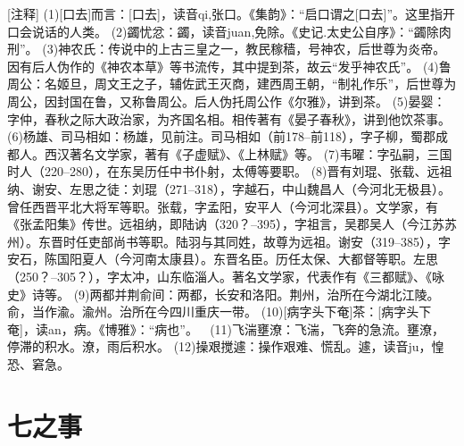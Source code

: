 \documentclass[12pt,UTF8]{ctexbook}
\begin{document}
[注释]
(1)[口去]而言：[口去]，读音qi,张口。《集韵》：“启口谓之[口去]”。这里指开口会说话的人类。
(2)蠲忧忿：蠲，读音juan,免除。《史记.太史公自序》：“蠲除肉刑”。
(3)神农氏：传说中的上古三皇之一，教民稼穑，号神农，后世尊为炎帝。因有后人伪作的《神农本草》等书流传，其中提到茶，故云“发乎神农氏”。
(4)鲁周公：名姬旦，周文王之子，辅佐武王灭商，建西周王朝，“制礼作乐”，后世尊为周公，因封国在鲁，又称鲁周公。后人伪托周公作《尔雅》，讲到茶。
(5)晏婴：字仲，春秋之际大政治家，为齐国名相。相传著有《晏子春秋》，讲到他饮茶事。
(6)杨雄、司马相如：杨雄，见前注。司马相如（前178--前118），字子柳，蜀郡成都人。西汉著名文学家，著有《子虚赋》、《上林赋》等。 
(7)韦曜：字弘嗣，三国时人（220--280），在东吴历任中书仆射，太傅等要职。
(8)晋有刘琨、张载、远祖纳、谢安、左思之徒：刘琨（271--318），字越石，中山魏昌人（今河北无极县）。曾任西晋平北大将军等职。张载，字孟阳，安平人（今河北深县）。文学家，有《张孟阳集》传世。远祖纳，即陆讷（320？--395），字祖言，吴郡吴人（今江苏苏州）。东晋时任吏部尚书等职。陆羽与其同姓，故尊为远祖。谢安（319--385），字安石，陈国阳夏人（今河南太康县）。东晋名臣。历任太保、大都督等职。左思（250？--305？），字太冲，山东临淄人。著名文学家，代表作有《三都赋》、《咏史》诗等。
(9)两都并荆俞间：两都，长安和洛阳。荆州，治所在今湖北江陵。俞，当作渝。渝州。治所在今四川重庆一带。
(10)[病字头下奄]茶：[病字头下奄]，读an，病。《博雅》：“病也”。 
(11)飞湍壅潦：飞湍，飞奔的急流。壅潦，停滞的积水。潦，雨后积水。
(12)操艰搅遽：操作艰难、慌乱。遽，读音ju，惶恐、窘急。

\chapter{七之事}
\end{document}

